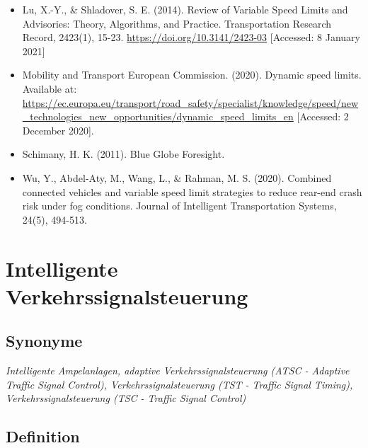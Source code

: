\documentclass[
]{book}
\begin{document}
\begin{itemize}
\item
  Lu, X.-Y., \& Shladover, S. E. (2014). Review of Variable Speed Limits and Advisories: Theory, Algorithms, and Practice. Transportation Research Record, 2423(1), 15-23. \url{https://doi.org/10.3141/2423-03} {[}Accessed: 8 January 2021{]}
\item
  Mobility and Transport \textbar{} European Commission. (2020). Dynamic speed limits. Available at: \url{https://ec.europa.eu/transport/road_safety/specialist/knowledge/speed/new_technologies_new_opportunities/dynamic_speed_limits_en} {[}Accessed: 2 December 2020{]}.
\item
  Schimany, H. K. (2011). Blue Globe Foresight.
\item
  Wu, Y., Abdel-Aty, M., Wang, L., \& Rahman, M. S. (2020). Combined connected vehicles and variable speed limit strategies to reduce rear-end crash risk under fog conditions. Journal of Intelligent Transportation Systems, 24(5), 494-513.
\end{itemize}

\hypertarget{adaptive_traffic_control}{%
\section{Intelligente Verkehrssignalsteuerung}\label{adaptive_traffic_control}}

\hypertarget{synonyme-14}{%
\subsection*{Synonyme}\label{synonyme-14}}

\emph{Intelligente Ampelanlagen, adaptive Verkehrssignalsteuerung (ATSC - Adaptive Traffic Signal Control), Verkehrssignalsteuerung (TST - Traffic Signal Timing), Verkehrssignalsteuerung (TSC - Traffic Signal Control)}

\hypertarget{definition-15}{%
\subsection*{Definition}\label{definition-15}}
\end{document}
